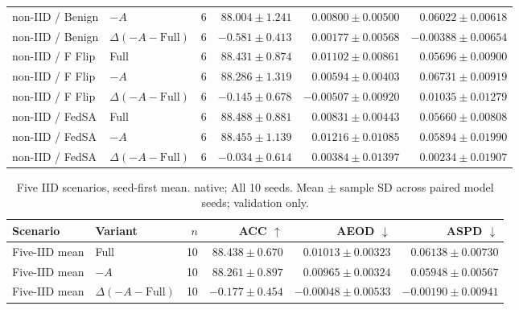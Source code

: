 \begin{table}[t]
\begin{tabular}{llrrrr}
non-IID / Benign & $-A$ & 6 & $88.004 \pm 1.241$ & $0.00800 \pm 0.00500$ & $0.06022 \pm 0.00618$ \\
non-IID / Benign & $\Delta(-A-\mathrm{Full})$ & 6 & $-0.581 \pm 0.413$ & $0.00177 \pm 0.00568$ & $-0.00388 \pm 0.00654$ \\
non-IID / F Flip & Full & 6 & $88.431 \pm 0.874$ & $0.01102 \pm 0.00861$ & $0.05696 \pm 0.00900$ \\
non-IID / F Flip & $-A$ & 6 & $88.286 \pm 1.319$ & $0.00594 \pm 0.00403$ & $0.06731 \pm 0.00919$ \\
non-IID / F Flip & $\Delta(-A-\mathrm{Full})$ & 6 & $-0.145 \pm 0.678$ & $-0.00507 \pm 0.00920$ & $0.01035 \pm 0.01279$ \\
non-IID / FedSA & Full & 6 & $88.488 \pm 0.881$ & $0.00831 \pm 0.00443$ & $0.05660 \pm 0.00808$ \\
non-IID / FedSA & $-A$ & 6 & $88.455 \pm 1.139$ & $0.01216 \pm 0.01085$ & $0.05894 \pm 0.01990$ \\
non-IID / FedSA & $\Delta(-A-\mathrm{Full})$ & 6 & $-0.034 \pm 0.614$ & $0.00384 \pm 0.01397$ & $0.00234 \pm 0.01907$ \\
\bottomrule
\end{tabular}
\end{table}

\begin{table}[t]
\centering
\small
\caption{Five IID scenarios, seed-first mean. native; All 10 seeds. Mean $\pm$ sample SD across paired model seeds; validation only.}
\begin{tabular}{llrrrr}
\toprule
Scenario & Variant & $n$ & ACC $\uparrow$ & AEOD $\downarrow$ & ASPD $\downarrow$ \\
\midrule
Five-IID mean & Full & 10 & $88.438 \pm 0.670$ & $0.01013 \pm 0.00323$ & $0.06138 \pm 0.00730$ \\
Five-IID mean & $-A$ & 10 & $88.261 \pm 0.897$ & $0.00965 \pm 0.00324$ & $0.05948 \pm 0.00567$ \\
Five-IID mean & $\Delta(-A-\mathrm{Full})$ & 10 & $-0.177 \pm 0.454$ & $-0.00048 \pm 0.00533$ & $-0.00190 \pm 0.00941$ \\
\bottomrule
\end{tabular}
\end{table}

